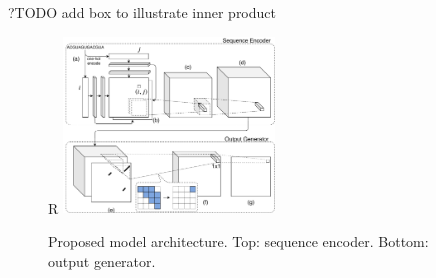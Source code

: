 \documentclass{article}
\begin{document}





%


%
%
%
%


?TODO add box to illustrate inner product

\begin{figure}{R}
        \centering
        \includegraphics[width=0.5\textwidth]{plot/nn_arch_1.pdf}
        \caption{Proposed model architecture. Top: sequence encoder. Bottom: output generator.}
        \label{fig:nn_arch_1}
        \centering
\end{figure}
\end{document}
